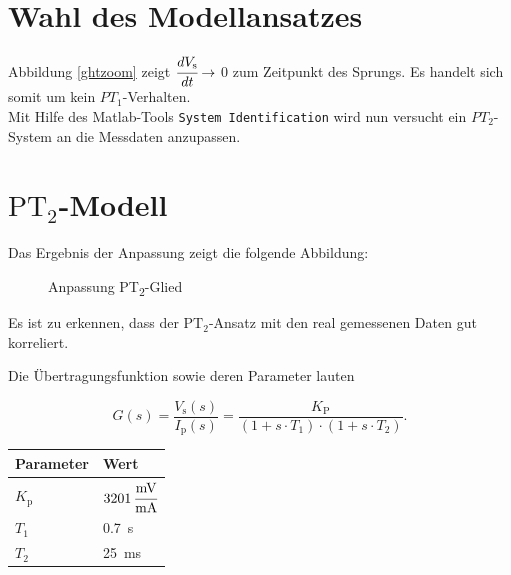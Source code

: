 \documentclass[12pt, oneside, a4paper]{scrreprt}
\newlength\fwidth
\newcommand{\mt}[1]{\textrm{#1}}
\begin{document}
\section{Wahl des Modellansatzes}
\label{ModAnsatz}
Abbildung \ref{ghtzoom} zeigt $\cfrac{dV_\mt{s}}{dt} \rightarrow$ 0 zum Zeitpunkt des Sprungs. Es handelt sich somit um kein $PT_1$-Verhalten.\\
Mit Hilfe des Matlab\cite{MATLAB}-Tools \texttt{System Identification} wird nun versucht ein $PT_2$-System an die Messdaten anzupassen. 

\section{$\mt{PT}_2$-Modell}
\label{PT2}
Das Ergebnis der Anpassung zeigt die folgende Abbildung:\\
\vspace{-1cm}
\begin{figure}[H]
 \begin{center}
  \setlength{}
  
 \end{center}
 \vspace{-1.0cm}
 \caption{Anpassung PT\textsubscript{2}-Glied}
 \label{gPT2}
\end{figure}

Es ist zu erkennen, dass der $\mt{PT}_2$-Ansatz mit den real gemessenen Daten gut korreliert.

Die Übertragungsfunktion sowie deren Parameter lauten

\begin{equation}
  G(s) = \frac{V_\mt{s}(s)}{I_\mt{p}(s)} = \frac{K_\mt{P}}{(1+s \cdot T_1) \cdot (1+s \cdot T_2)} .
\end{equation}

\begin{center}
  
 \begin{tabular}{|p{2cm}|p{3cm}|}
 \hline
 Parameter & Wert   \\ \hline\hline
 $K_\mt{p}$ & $\SI{3201}{\cfrac{mV}{mA}}$    \\ \hline
 $T_1$ & \SI{0.7}{s}  \\ \hline
 $T_2$ & \SI{25}{ms}  \\ \hline
 \end{tabular}
\end{center}
\end{document}
